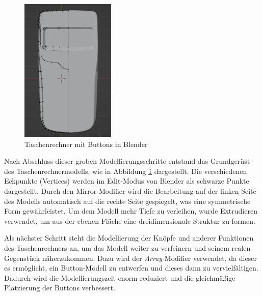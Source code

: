 \begin{figure}[H]
    \centering
    \includegraphics[width=0.4\textwidth]{images/basis.png}
    \caption{Taschenrechner mit Buttons in Blender}
    \label{fig:Basis}
\end{figure}

Nach Abschluss dieser groben Modellierungsschritte entstand das Grundgerüst des Taschenrechnermodells, wie in Abbildung \ref{fig:Basis} dargestellt. Die verschiedenen Eckpunkte (Vertices) werden im Edit-Modus von Blender als schwarze Punkte dargestellt. Durch den Mirror Modifier wird die Bearbeitung auf der linken Seite des Modells automatisch auf die rechte Seite gespiegelt, was eine symmetrische Form gewährleistet. Um dem Modell mehr Tiefe zu verleihen, wurde Extrudieren verwendet, um aus der ebenen Fläche eine dreidimensionale Struktur zu formen.


Als nächster Schritt steht die Modellierung der Knöpfe und anderer Funktionen des Taschenrechners an, um das Modell weiter zu verfeinern und seinem realen Gegenstück näherzukommen. Dazu wird der \textit{Array}-Modifier verwendet, da dieser es ermöglicht, ein Button-Modell zu entwerfen und dieses dann zu vervielfältigen. Dadurch wird die Modellierungszeit enorm reduziert und die gleichmäßige Platzierung der Buttons verbessert.

